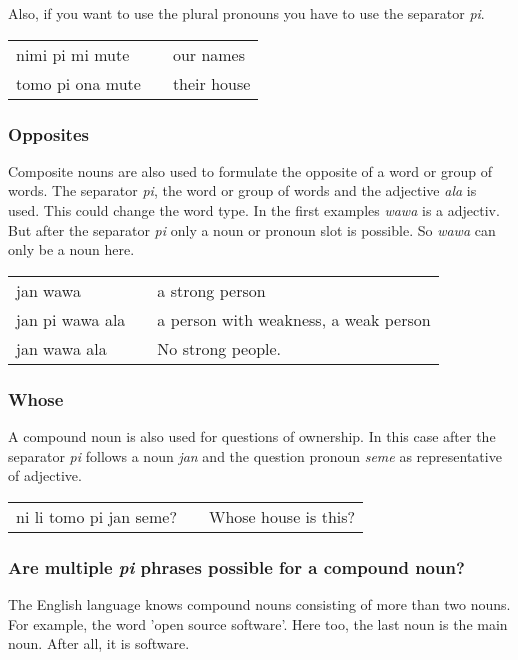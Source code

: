 Also, if you want to use the plural pronouns you have to use the separator \textit{pi}.

\begin{supertabular}{p{5,5cm}|ll}
    nimi pi mi mute  &  & our names   \\
    tomo pi ona mute &  & their house \\
\end{supertabular}

\subsubsection*{Opposites}
Composite nouns are also used to formulate the opposite of a word or group of words.
The separator \textit{pi}, the word or group of words and the adjective \textit{ala} is used.
This could change the word type.
In the first examples \textit{wawa} is a adjectiv.
But after the separator \textit{pi} only a noun or pronoun slot is possible.
So \textit{wawa} can only be a noun here.

\begin{supertabular}{p{5,5cm}|ll}
    jan wawa        &  & a strong person                       \\
    jan pi wawa ala &  & a person with weakness, a weak person \\
    jan wawa ala    &  & No strong people.                     \\
\end{supertabular}

\subsubsection*{Whose}
A compound noun is also used for questions of ownership.
In this case after the separator \textit{pi} follows a noun \textit{jan} and the question pronoun \textit{seme} as representative of adjective.

\begin{supertabular}{p{5,5cm}|ll}
    ni li tomo pi jan seme? &  & Whose house is this? \\
\end{supertabular}

\subsubsection*{Are multiple \textit{pi} phrases possible for a compound noun?}
The English language knows compound nouns consisting of more than two nouns.
For example, the word 'open source software'.
Here too, the last noun is the main noun.
After all, it is software.

